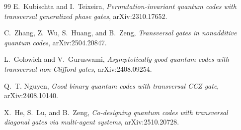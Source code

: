 \documentclass[11pt]{article}
\begin{document}
\begin{thebibliography}{99}
E.~Kubischta and I.~Teixeira,
\emph{Permutation-invariant quantum codes with transversal generalized phase gates},
arXiv:2310.17652.

C.~Zhang, Z.~Wu, S.~Huang, and B.~Zeng,
\emph{Transversal gates in nonadditive quantum codes},
arXiv:2504.20847.

L.~Golowich and V.~Guruswami,
\emph{Asymptotically good quantum codes with transversal non-Clifford gates},
arXiv:2408.09254.

Q.~T. Nguyen,
\emph{Good binary quantum codes with transversal CCZ gate},
arXiv:2408.10140.

X.~He, S.~Lu, and B.~Zeng,
\emph{Co-designing quantum codes with transversal diagonal gates via multi-agent systems},
arXiv:2510.20728.

\end{thebibliography}
\end{document}
